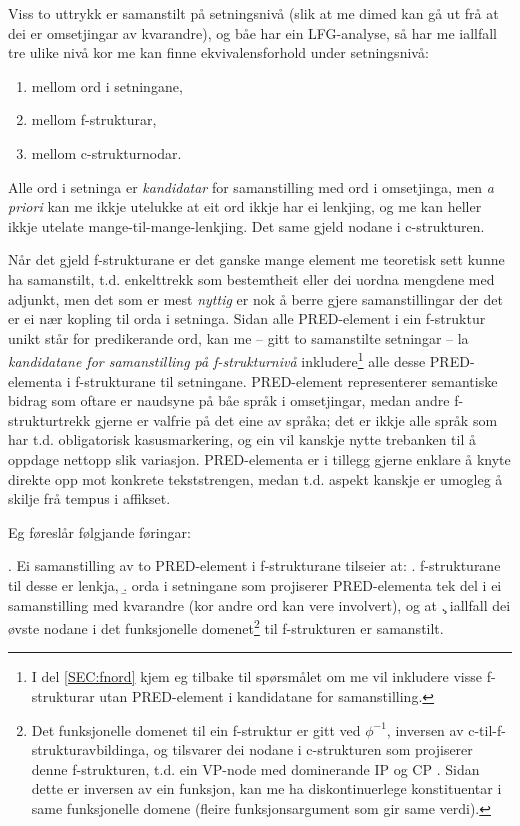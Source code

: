 \documentclass[11pt,a4paper,oneside,draft]{book}
\begin{document}
Viss to uttrykk er samanstilt på setningsnivå (slik at me dimed kan gå
ut frå at dei er omsetjingar av kvarandre), og båe har ein
LFG-analyse, så har me iallfall tre ulike nivå kor me kan finne
ekvivalensforhold under setningsnivå:
\begin{enumerate}
\item mellom ord i setningane,
\item mellom f-strukturar,
\item mellom c-strukturnodar.
\end{enumerate}
Alle ord i setninga er \emph{kandidatar} for samanstilling med ord i
omsetjinga, men \emph{a priori} kan me ikkje utelukke at eit ord ikkje har ei
lenkjing, og me kan heller ikkje utelate mange-til-mange-lenkjing. Det
same gjeld nodane i c-strukturen.


Når det gjeld f-strukturane er det ganske mange element me teoretisk
sett kunne ha samanstilt, t.d. enkelttrekk som bestemtheit eller dei
uordna mengdene med adjunkt, men det som er mest \emph{nyttig} er nok å
berre gjere samanstillingar der det er ei nær kopling til orda i
setninga. Sidan alle PRED-element i ein f-struktur unikt står for
predikerande ord, kan me -- gitt to samanstilte setningar -- la
\emph{kandidatane for samanstilling på f-strukturnivå} inkludere\footnote{I del \ref{SEC:fnord} kjem eg tilbake til spørsmålet om me vil
        inkludere visse f-strukturar utan PRED-element i kandidatane
        for samanstilling. }
alle desse PRED-elementa i f-strukturane til setningane. PRED-element
representerer semantiske bidrag som oftare er naudsyne på båe språk i
omsetjingar, medan andre f-strukturtrekk gjerne er valfrie på det eine
av språka; det er ikkje alle språk som har t.d. obligatorisk
kasusmarkering, og ein vil kanskje nytte trebanken til å oppdage
nettopp slik variasjon.  PRED-elementa er i tillegg gjerne enklare å
knyte direkte opp mot konkrete tekststrengen, medan t.d. aspekt
kanskje er umogleg å skilje frå tempus i affikset.

Eg føreslår følgjande føringar:

\ex. \label{f-links} Ei samanstilling av to PRED-element i f-strukturane tilseier at:
\a. \label{f-links-substr} f-strukturane til desse er lenkja,
\b. \label{f-links-words} orda i setningane som projiserer
   PRED-elementa tek del i ei samanstilling med kvarandre (kor andre
   ord kan vere involvert), og at
\c. \label{f-links-domain} iallfall dei øvste nodane i det funksjonelle
   domenet\footnote{Det funksjonelle domenet til ein f-struktur er gitt ved
 $\phi^{-1}$, inversen av c-til-f-strukturavbildinga, og tilsvarer dei
 nodane i c-strukturen som projiserer denne f-strukturen, t.d. ein
 VP-node med dominerande IP og CP
 \citep[s.~126]{bresnan2001lfs}. Sidan dette er inversen av ein
 funksjon, kan me ha diskontinuerlege konstituentar i same
 funksjonelle domene (fleire funksjonsargument som gir same verdi). } til f-strukturen er samanstilt.
\end{document}
